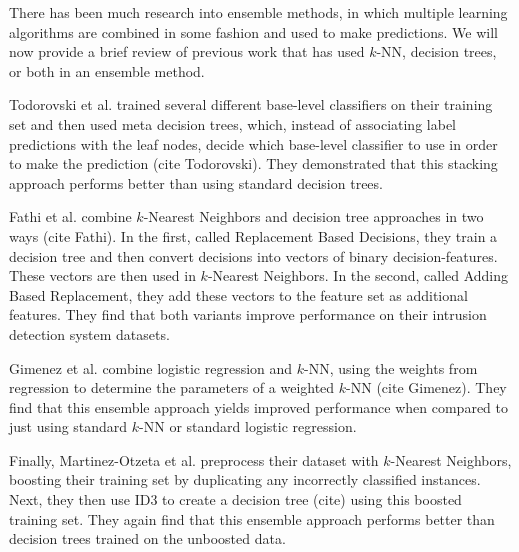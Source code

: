 There has been much research into ensemble methods, in which multiple learning algorithms are combined in some fashion and used to make predictions. We will now provide a brief review of previous work that has used $k$-NN, decision trees, or both in an ensemble method.

 Todorovski et al. trained several different base-level classifiers on their training set and then used meta decision trees, which, instead of associating label predictions with the leaf nodes, decide which base-level classifier to use in order to make the prediction (cite Todorovski). They demonstrated that this stacking approach performs better than using standard decision trees.

Fathi et al. combine $k$-Nearest Neighbors and decision tree approaches in two ways (cite Fathi). In the first, called Replacement Based Decisions, they train a decision tree and then convert decisions into vectors of binary decision-features. These vectors are then used in $k$-Nearest Neighbors. In the second, called Adding Based Replacement, they add these vectors to the feature set as additional features. They find that both variants improve performance on their intrusion detection system datasets.

Gimenez et al. combine logistic regression and $k$-NN, using the weights from regression to determine the parameters of a weighted $k$-NN (cite Gimenez). They find that this ensemble approach yields improved performance when compared to just using standard $k$-NN or standard logistic regression. 

Finally, Martinez-Otzeta et al. preprocess their dataset with $k$-Nearest Neighbors, boosting their training set by duplicating  any incorrectly classified instances.  Next, they then use ID3 to create a decision tree (cite) using this boosted training set. They again find that this ensemble approach performs better than decision trees trained on the unboosted data. 

